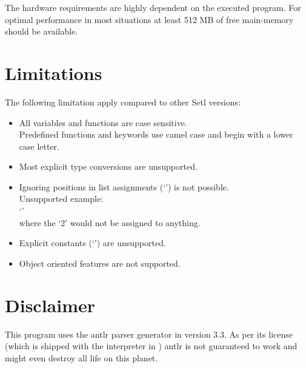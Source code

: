 The hardware requirements are highly dependent on the executed \SetlX{} program. For optimal performance in most situations at least 512 MB of free main-memory should be available.

\section{Limitations}
The following limitation apply compared to other Setl versions:

\begin{itemize}
	\item All variables and functions are case sensitive.\\
        Predefined functions and keywords use camel case and begin with a lower case letter.
    \item Most explicit type conversions are unsupported.
    \item Ignoring positions in list assignments (`\command{-}') is not possible.\\
        Unsupported example:\\
        `\command{[x,-,y] := [1,2,3];}'\\
        where the `2' would not be assigned to anything.
    \item Explicit constants (`') are unsupported.
    \item Object oriented features are not supported.
\end{itemize}

\section{Disclaimer}
This program uses the antlr parser generator in version 3.3. As per its license (which is shipped with the interpreter in ) antlr is not guaranteed to work and might even destroy all life on this planet.


